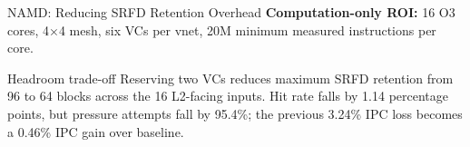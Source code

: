 \documentclass[aspectratio=169,11pt]{beamer}
\begin{document}
\begin{frame}{NAMD: Reducing SRFD Retention Overhead}
  \small
  \textbf{Computation-only ROI:} 16 O3 cores, 4$\times$4 mesh, six VCs per
  vnet, 20M minimum measured instructions per core.
  \vspace{0.15cm}

  \centering

  \vspace{0.3cm}
  \begin{block}{Headroom trade-off}
    Reserving two VCs reduces maximum SRFD retention from 96 to 64 blocks
    across the 16 L2-facing inputs. Hit rate falls by 1.14 percentage points,
    but pressure attempts fall by 95.4\%; the previous 3.24\% IPC loss becomes
    a 0.46\% IPC gain over baseline.
  \end{block}
\end{frame}
\end{document}
